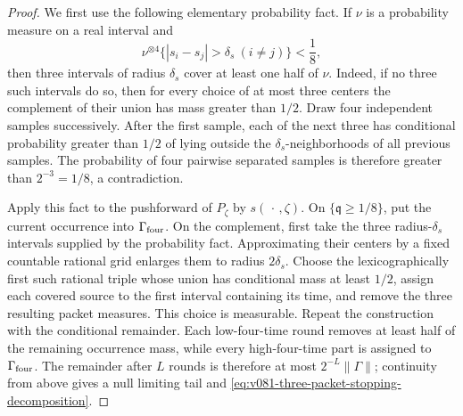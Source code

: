 \documentclass[10pt]{article}
\begin{document}
\begin{proof}
We first use the following elementary probability fact.  If \(\nu\) is a probability measure on a
real interval and
\[
\nu^{\otimes4}\{ |s_i-s_j|>\delta_s\ (i\ne j)\}<\frac18,
\]
then three intervals of radius \(\delta_s\) cover at least one half of \(\nu\).  Indeed, if no three
such intervals do so, then for every choice of at most three centers the complement of their union
has mass greater than \(1/2\).  Draw four independent samples successively.  After the first
sample, each of the next three has conditional probability greater than \(1/2\) of lying outside
the \(\delta_s\)-neighborhoods of all previous samples.  The probability of four pairwise separated
samples is therefore greater than \(2^{-3}=1/8\), a contradiction.

Apply this fact to the pushforward of \(P_\zeta\) by \(s(\,\cdot\,,\zeta)\).  On
\(\{\mathfrak q\ge1/8\}\), put the current occurrence into \(\Gamma_{\rm four}\).  On the
complement, first take the three radius-\(\delta_s\) intervals supplied by the probability fact.
Approximating their centers by a fixed countable rational grid enlarges them to radius
\(2\delta_s\).  Choose the lexicographically first such rational triple whose union has conditional
mass at least \(1/2\), assign each covered source to the first interval containing its time, and
remove the three resulting packet measures.  This choice is measurable.  Repeat the
construction with the conditional remainder.  Each low-four-time round removes at least half of
the remaining occurrence mass, while every high-four-time part is assigned to
\(\Gamma_{\rm four}\).  The remainder after \(L\) rounds is therefore at most \(2^{-L}\|\Gamma\|\);
continuity from above gives a null limiting tail and
\eqref{eq:v081-three-packet-stopping-decomposition}.
\end{proof}
\end{document}
